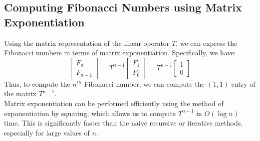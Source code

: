 \documentclass[openany]{book}
\begin{document}
\subsection{Computing Fibonacci Numbers using Matrix Exponentiation}
Using the matrix representation of the linear operator $T$, we can express the Fibonacci numbers in terms of matrix exponentiation. Specifically, we have:
\[
    \begin{bmatrix}F_n \\ F_{n-1} \end{bmatrix} = T^{n-1} \begin{bmatrix}F_1 \\ F_0 \end{bmatrix} = T^{n-1} \begin{bmatrix}1 \\ 0 \end{bmatrix}
\]
Thus, to compute the $n^{th}$ Fibonacci number, we can compute the $(1,1)$ entry of the matrix $T^{n-1}$. \\
Matrix exponentiation can be performed efficiently using the method of exponentiation by squaring, which allows us to compute $T^{n-1}$ in $O(\log n)$ time. This is significantly faster than the naive recursive or iterative methods, especially for large values of $n$. \\
\end{document}
